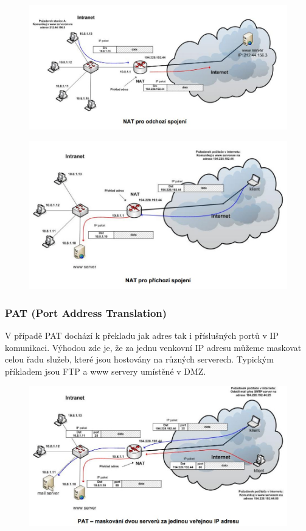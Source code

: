 \begin{figure}[H]
\centering
\includegraphics[width=1\textwidth]{assets/6_nat_out}
\end{figure}

\begin{figure}[H]
\centering
\includegraphics[width=1\textwidth]{assets/6_nat_in}
\end{figure}

\subsubsection{PAT (Port Address Translation)}
V případě PAT dochází k překladu jak adres tak i příslušných portů v IP komunikaci. Výhodou zde je, že za jednu venkovní IP adresu můžeme maskovat celou řadu služeb, které jsou hostovány na různých serverech. Typickým příkladem jsou FTP a www servery umístěné v DMZ. 
\begin{figure}[H]
\centering
\includegraphics[width=1\textwidth]{assets/6_pat_mask}
\end{figure}